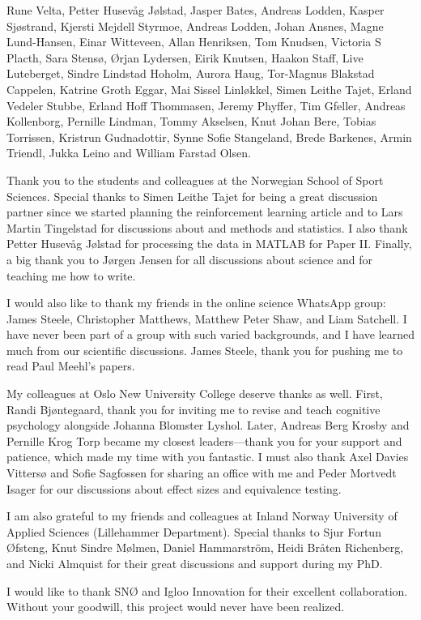 Rune Velta, Petter Husevåg Jølstad, Jasper Bates, Andreas Lodden, Kasper Sjøstrand, Kjersti Mejdell Styrmoe, Andreas Lodden, Johan Ansnes, Magne Lund-Hansen, Einar Witteveen, Allan Henriksen, Tom Knudsen, Victoria S Placth, Sara Stensø, Ørjan Lydersen, Eirik Knutsen, Haakon Staff, Live Luteberget, Sindre Lindstad Hoholm, Aurora Haug, Tor-Magnus Blakstad Cappelen, Katrine Groth Eggar, Mai Sissel Linløkkel, Simen Leithe Tajet, Erland Vedeler Stubbe, Erland Hoff Thommasen, Jeremy Phyffer, Tim Gfeller, Andreas Kollenborg, Pernille Lindman, Tommy Akselsen, Knut Johan Bere, Tobias Torrissen, Kristrun Gudnadottir, Synne Sofie Stangeland, Brede Barkenes, Armin Triendl, Jukka Leino and William Farstad Olsen.

Thank you to the students and colleagues at the Norwegian School of Sport Sciences. Special thanks to Simen Leithe Tajet for being a great discussion partner since we started planning the reinforcement learning article and to Lars Martin Tingelstad for discussions about and methods and statistics. I also thank Petter Husevåg Jølstad for processing the data in MATLAB for Paper II. Finally, a big thank you to Jørgen Jensen for all discussions about science and for teaching me how to write.

I would also like to thank my friends in the online science WhatsApp group: James Steele, Christopher Matthews, Matthew Peter Shaw, and Liam Satchell. I have never been part of a group with such varied backgrounds, and I have learned much from our scientific discussions. James Steele, thank you for pushing me to read Paul Meehl’s papers.

My colleagues at Oslo New University College deserve thanks as well. First, Randi Bjøntegaard, thank you for inviting me to revise and teach cognitive psychology alongside Johanna Blomster Lyshol. Later, Andreas Berg Krosby and Pernille Krog Torp became my closest leaders—thank you for your support and patience, which made my time with you fantastic. I must also thank Axel Davies Vittersø and Sofie Sagfossen for sharing an office with me and Peder Mortvedt Isager for our discussions about effect sizes and equivalence testing.

I am also grateful to my friends and colleagues at Inland Norway University of Applied Sciences (Lillehammer Department). Special thanks to Sjur Fortun Øfsteng, Knut Sindre Mølmen, Daniel Hammarström, Heidi Bråten Richenberg, and Nicki Almquist for their great discussions and support during my PhD.

I would like to thank SNØ and Igloo Innovation for their excellent collaboration. Without your goodwill, this project would never have been realized.

